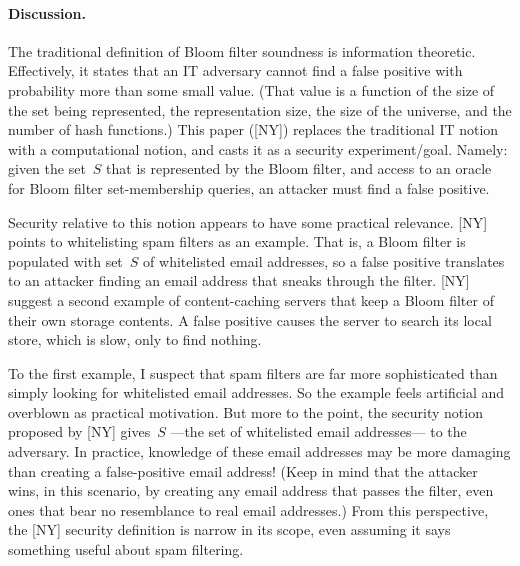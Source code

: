 \paragraph{Discussion. }
The traditional definition of Bloom filter soundness is information theoretic.  Effectively, it states that an IT adversary cannot find a false positive with probability more than some small value.  (That value is a function of the size of the set being represented, the representation size, the size of the universe, and the number of hash functions.)  This paper ([NY]) replaces the traditional IT notion with a computational notion, and casts it as a security experiment/goal.  Namely: given the set~$S$ that is represented by the Bloom filter, and access to an oracle for Bloom filter set-membership queries, an attacker must find a false positive.  


Security relative to this notion appears to have some practical relevance.  [NY] points to whitelisting spam filters as an example.  That is, a Bloom filter is populated with set~$S$ of whitelisted email addresses, so a false positive translates to an attacker finding an email address that sneaks through the filter.  [NY] suggest a second example of content-caching servers that keep a Bloom filter of their own storage contents.  A false positive causes the server to search its local store, which is slow, only to find nothing. 

To the first example, I suspect that spam filters are far more sophisticated than simply looking for whitelisted email addresses.  So the example feels artificial and overblown as practical motivation.  But more to the point, the security notion proposed by [NY] gives~$S$ ---the set of whitelisted email addresses--- to the adversary.  In practice, knowledge of these email addresses may be more damaging than creating a false-positive email address! (Keep in mind that the attacker wins, in this scenario, by creating any email address that passes the filter, even ones that bear no resemblance to real email addresses.)  From this perspective, the [NY] security definition is narrow in its scope, even assuming it says something useful about spam filtering.


